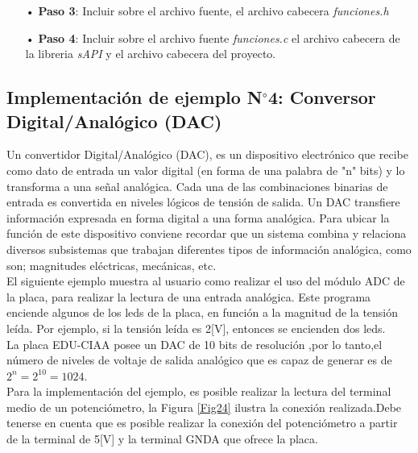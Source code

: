 \documentclass[12pt,letterpaper]{article}
\begin{document}
\begin{enumerate}
\item[•]\textbf{Paso 3}: Incluir sobre el archivo fuente, el archivo cabecera \textit{funciones.h}

\item[•]\textbf{Paso 4}: Incluir sobre el archivo fuente \textit{funciones.c} el archivo cabecera de la libreria \textit{sAPI} y el archivo cabecera del proyecto.

\end{enumerate}

\subsection{Implementación de ejemplo N$^{\circ}$4: Conversor Digital/Analógico (DAC)}\label{sec:ej4sapi}

Un convertidor Digital/Analógico (DAC), es un dispositivo electrónico que recibe como dato de entrada un valor digital (en forma de una palabra de "n" bits) y lo transforma a una señal analógica. Cada una de las combinaciones binarias de entrada es convertida en niveles lógicos de tensión de salida. Un DAC transfiere información expresada en forma digital a una forma analógica. Para ubicar la función de este dispositivo conviene recordar que un sistema combina y relaciona diversos subsistemas que trabajan diferentes tipos de información analógica, como son; magnitudes eléctricas, mecánicas, etc.
 \\
 
El siguiente ejemplo muestra al usuario como realizar el uso del módulo ADC de la placa, para realizar la lectura de una entrada analógica. Este programa enciende algunos de los leds de la placa, en función a la magnitud de la tensión leída. Por ejemplo, si la tensión leída es 2[V], entonces se encienden dos leds.
 \\
 
La placa EDU-CIAA posee un DAC de 10 bits de resolución ,por lo tanto,el número de niveles de voltaje de salida analógico que es capaz de generar es de $2^{n}=2^{10}=1024$.
 \\
 
Para la implementación del ejemplo, es posible realizar la lectura del terminal medio de un potenciómetro, la Figura \ref{Fig24} ilustra la conexión realizada.Debe tenerse en cuenta que es posible realizar la conexión del potenciómetro a partir de la terminal de 5[V] y la terminal GNDA que ofrece la placa.
\end{document}
